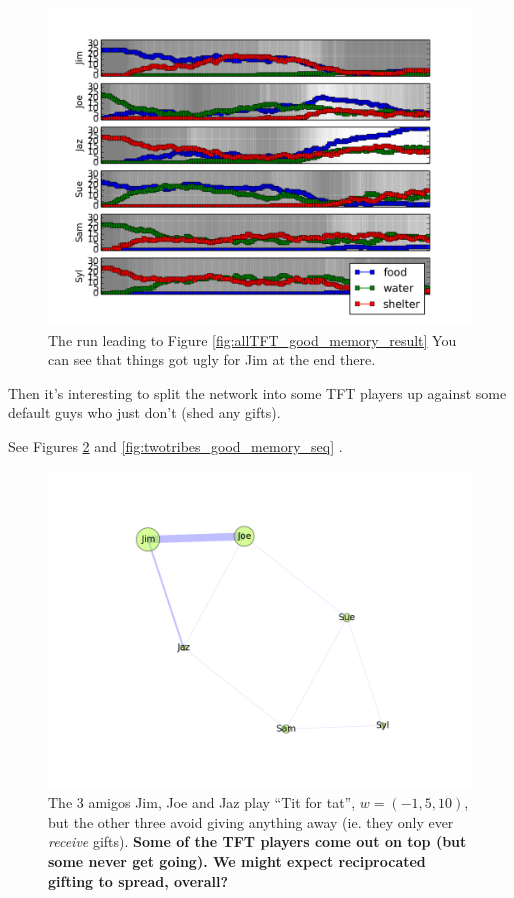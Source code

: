 \documentclass[11pt]{article}
\begin{document}
\begin{figure}[b]
\includegraphics[width=\textwidth]{allTFT_good_memory_seq}
\caption{\label{fig:allTFT_good_memory_seq} 
The run leading to Figure \ref{fig:allTFT_good_memory_result} 
You can see that things got ugly for Jim at the end there.}
\end{figure}


Then it's interesting to split the network into some TFT players up against some
default guys who just don't (shed any gifts).

See Figures \ref{fig:twotribes_good_memory_result}  and \ref{fig:twotribes_good_memory_seq} .

\begin{figure}[b]
\includegraphics[width=.85\textwidth]{twotribes_good_memory_result}
\caption{\label{fig:twotribes_good_memory_result} 
The 3 amigos Jim, Joe and Jaz play ``Tit for tat'', $w=(-1,5,10)$, but the other three avoid giving anything away (ie. they only ever {\it receive} gifts).  {\bf Some of the TFT players come out on top (but some never get going). We might expect reciprocated gifting to spread, overall? }}
\end{figure}
\end{document}
